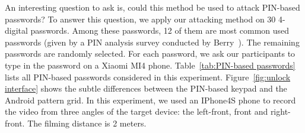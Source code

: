         An interesting question to ask is, could this method be used to attack PIN-based passwords? To answer this
        question, we apply our attacking method on 30 4-digital passwords. Among these passwords, 12 of them are most
        common used passwords (given by a PIN analysis survey conducted by Berry~\cite{Nick_pin_analysis}). The
        remaining passwords are randomly selected. For each password, we ask our participants to type in the password
        on a Xiaomi MI4 phone. Table~\ref{tab:PIN-based passwords} lists all PIN-based passwords considered in this
        experiment. Figure~\ref{fig:unlock interface} shows the subtle differences between the PIN-based keypad and the
        Android pattern grid. In this experiment, we used an IPhone4S phone to record the video from three angles of
        the target device: the
        left-front, front and right-front. The filming distance is 2 meters.

